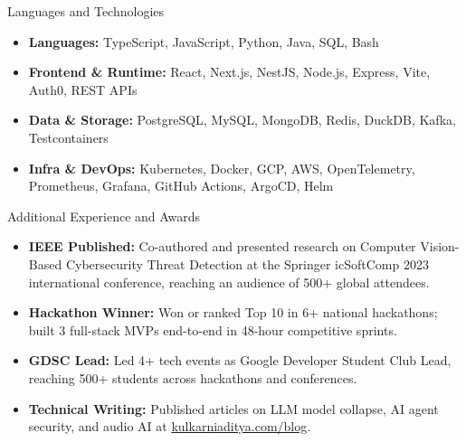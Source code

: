 \documentclass[]{mcdowellcv}
\begin{document}
\begin{cvsection}{Languages and Technologies}
  \begin{cvsubsection}{}{}{}
    \begin{itemize}
      \item \textbf{Languages:} TypeScript, JavaScript, Python, Java, SQL, Bash
      \item \textbf{Frontend \& Runtime:} React, Next.js, NestJS, Node.js, Express, Vite, Auth0, REST APIs
      \item \textbf{Data \& Storage:} PostgreSQL, MySQL, MongoDB, Redis, DuckDB, Kafka, Testcontainers
      \item \textbf{Infra \& DevOps:} Kubernetes, Docker, GCP, AWS, OpenTelemetry, Prometheus, Grafana, GitHub Actions, ArgoCD, Helm
    \end{itemize}
  \end{cvsubsection}
\end{cvsection}

\begin{cvsection}{Additional Experience and Awards}
  \begin{cvsubsection}{}{}{}
    \begin{itemize}
      \item \textbf{IEEE Published:} Co-authored and presented research on Computer Vision-Based Cybersecurity Threat Detection at the Springer icSoftComp 2023 international conference, reaching an audience of 500+ global attendees.
      \item \textbf{Hackathon Winner:} Won or ranked Top 10 in 6+ national hackathons; built 3 full-stack MVPs end-to-end in 48-hour competitive sprints.
      \item \textbf{GDSC Lead:} Led 4+ tech events as Google Developer Student Club Lead, reaching 500+ students across hackathons and conferences.
      \item \textbf{Technical Writing:} Published articles on LLM model collapse, AI agent security, and audio AI at \href{https://www.kulkarniaditya.com/blog}{kulkarniaditya.com/blog}.
    \end{itemize}
  \end{cvsubsection}
\end{cvsection}
\end{document}
